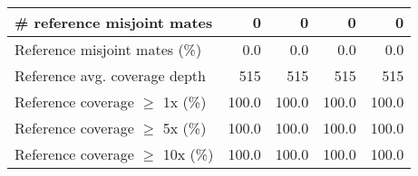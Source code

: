 \documentclass[12pt,a4paper]{article}
\begin{document}
\begin{table}[ht]
\begin{center}
\begin{tabular}{|l*{4}{|r}|}
\# reference misjoint mates & 0 & 0 & 0 & 0 \\ \hline
Reference misjoint mates (\%) & 0.0 & 0.0 & 0.0 & 0.0 \\ \hline
Reference avg. coverage depth & 515 & 515 & 515 & 515 \\ \hline
Reference coverage $\geq$ 1x (\%) & 100.0 & 100.0 & 100.0 & 100.0 \\ \hline
Reference coverage $\geq$ 5x (\%) & 100.0 & 100.0 & 100.0 & 100.0 \\ \hline
Reference coverage $\geq$ 10x (\%) & 100.0 & 100.0 & 100.0 & 100.0 \\ \hline
\end{tabular}
\end{center}
\end{table}
\end{document}
